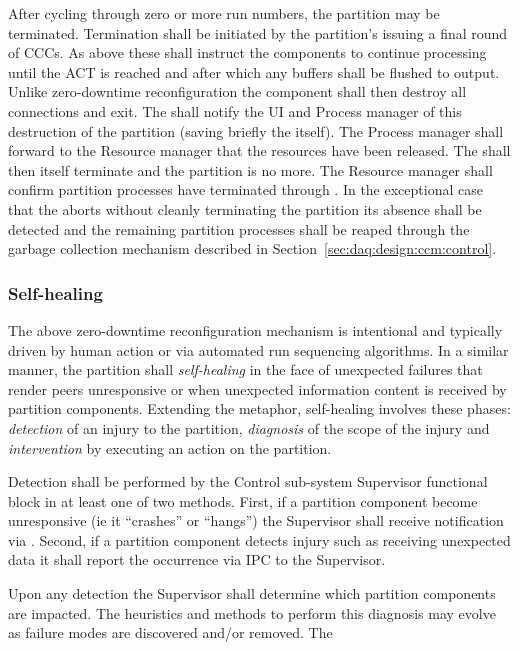 After cycling through zero or more run numbers, the partition may be terminated. 
Termination shall be initiated by the partition's  issuing a final round of CCCs. 
As above these shall instruct the components to continue processing until the ACT is reached and after which any buffers shall be flushed to output. 
Unlike zero-downtime reconfiguration the component shall then destroy all connections and exit. 
The  shall notify the UI and Process manager of this destruction of the partition (saving briefly the  itself). 
The Process manager shall forward to the Resource manager that the resources have been released. 
The  shall then itself terminate and the partition is no more.
The Resource manager shall confirm partition processes have terminated through . 
In the exceptional case that the  aborts without cleanly terminating the partition its absence shall be detected and the remaining partition processes shall be reaped through the garbage collection mechanism described in Section~\ref{sec:daq:design:ccm:control}.

\subsubsection{Self-healing}
\label{sec:daq:self-healing}

The above zero-downtime reconfiguration mechanism is intentional and typically driven by human action or via automated run sequencing algorithms. 
In a similar manner, the partition shall \textit{self-healing} in the face of unexpected failures that render peers unresponsive or when unexpected information content is received by partition components.  
Extending the metaphor, self-healing involves these phases: \textit{detection} of an injury to the partition, \textit{diagnosis} of the scope of the injury and \textit{intervention} by executing an action on the partition.

Detection shall be performed by the  Control sub-system Supervisor functional block in at least one of two methods.
First, if a partition component become unresponsive (ie it ``crashes'' or ``hangs'') the Supervisor shall receive notification via  . 
Second, if a partition component detects injury such as receiving unexpected data it shall report the occurrence via IPC to the Supervisor.

Upon any detection the Supervisor shall determine which partition components are impacted.  The heuristics and methods to perform this diagnosis may evolve as failure modes are discovered and/or removed.  The 

